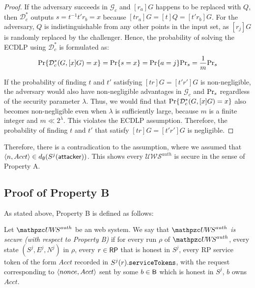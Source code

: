 \begin{proof}
    If the adversary succeeds in $\mathcal{G}_c$ and $[r_a]G$ happens to be replaced with $Q$, 
    then $\mathcal{D}^*_c$ outputs $s=t^{-1}t'r_b =x$ because $[tr_a]G = [t]Q = [t'r_b]G$. 
    For the adversary, $Q$ is indistinguishable from any other points in the input set, 
    as $[r_j]G$ is randomly replaced by the challenger.
    Hence, the probability of solving the ECDLP using $\mathcal{D}^*_c$ is formulated as:
    \begin{equation*}
      {\rm Pr}\{\mathcal{D}^*_c(G, [x]G)=x\} = {\rm Pr}\{s = x\}={\rm Pr}\{a=j\}{\rm Pr}_s=\frac{1}{m}{\rm Pr}_s
    \end{equation*}
  
    If the probability of finding $t$ and $t'$ satisfying $[tr]G = [t'r']G$ is non-negligible, 
    the adversary would also have non-negligible advantages in $\mathcal{G}_c$ and ${\rm Pr}_s$ regardless of the security parameter $\lambda$.
    Thus, we would find that ${\rm Pr}\{\mathcal{D}^*_c(G, [x]G)=x\}$ also becomes non-negligible even when $\lambda$ is sufficiently large, 
    because $m$ is a finite integer and $m \ll 2^\lambda$.
    This violates the ECDLP assumption. 
    Therefore, the probability of finding $t$ and $t'$ that satisfy $[tr]G = [t'r']G$ is negligible.
  \end{proof}
  
  Therefore, there is a contradication to the assumption, where we assumed that 
  $\langle {{}n, Acct} \rangle \in d_{\emptyset}(S^j(\mathsf{attacker}))$. 
  This shows every $\mathcal{U\!W\!S}^{auth}$ is secure in the sense of Property A.
  
  \subsection{Proof of Property B}
  As stated above, Property B is defined as follows:
  \begin{definition}\label{def:B}
    Let $\uppressoauthwebsystem$ be an \uppresso web system. We say that
    \emph{$\uppressoauthwebsystem$ is secure (with respect to Property B)} if
    for every run $\rho$ of $\uppressoauthwebsystem$, every state $(S^j, E^j, N^j)$
    in $\rho$, every $r\in \mathsf{RP}$ that is honest in $S^j$, 
    every RP service token of the form $Acct$ recorded in
    $S^j(r).\mathtt{serviceTokens}$, with the request corresponding to
    $\langle {{}nonce, Acct} \rangle$ sent by some $b\in \mathsf{B}$ which is honest in $S^j$, $b$ owns $Acct$.
  \end{definition}
  
